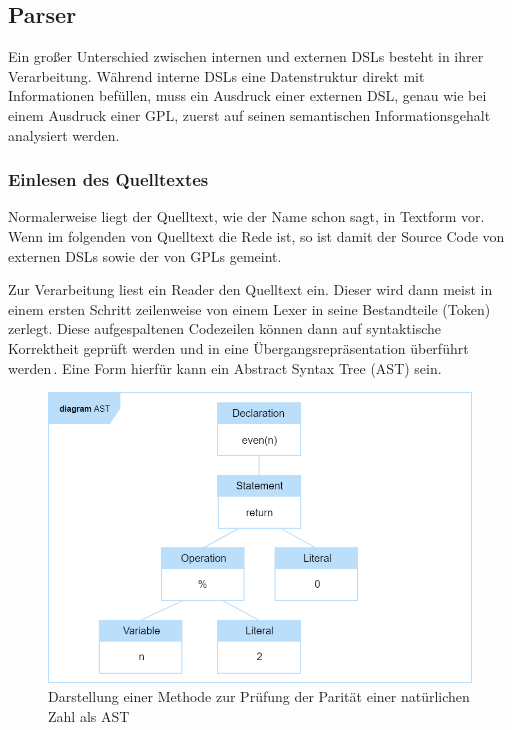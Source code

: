 \documentclass[12pt,oneside,a4paper,parskip]{scrbook}
\begin{document}
\subsection{Parser}

Ein großer Unterschied zwischen internen und externen DSLs besteht in ihrer Verarbeitung. Während interne DSLs eine Datenstruktur direkt mit Informationen befüllen, muss ein Ausdruck einer externen DSL, genau wie bei einem Ausdruck einer GPL, zuerst auf seinen semantischen Informationsgehalt analysiert werden.

\subsubsection{Einlesen des Quelltextes}

Normalerweise liegt der Quelltext, wie der Name schon sagt, in Textform vor. Wenn im folgenden von Quelltext die Rede ist, so ist damit der Source Code von externen DSLs sowie der von GPLs gemeint.

Zur Verarbeitung liest ein Reader den Quelltext ein. Dieser wird dann meist in einem ersten Schritt zeilenweise von einem Lexer in seine Bestandteile (Token) zerlegt. Diese aufgespaltenen Codezeilen können dann auf syntaktische Korrektheit geprüft werden und in eine Übergangsrepräsentation überführt werden\,\cite[S. 29f.]{parr2009}. Eine Form hierfür kann ein Abstract Syntax Tree (AST) sein.

\begin{figure}[htbp]
\centering
\includegraphics[width=1.0\textwidth]{bilder/ast}
\caption{Darstellung einer Methode zur Prüfung der Parität einer natürlichen Zahl als AST}
\label{fig:ast}
\end{figure}
\end{document}
